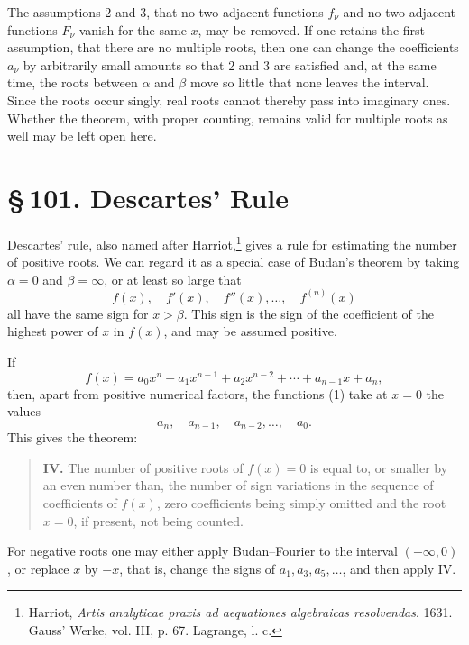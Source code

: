 \documentclass[11pt]{article}
\providecommand{\sect}[2]{\section*{\S\,#1. #2}}
\begin{document}
The assumptions 2 and 3, that no two adjacent functions $f_\nu$ and no two adjacent functions $F_\nu$ vanish for the same $x$, may be removed. If one retains the first assumption, that there are no multiple roots, then one can change the coefficients $a_\nu$ by arbitrarily small amounts so that 2 and 3 are satisfied and, at the same time, the roots between $\alpha$ and $\beta$ move so little that none leaves the interval. Since the roots occur singly, real roots cannot thereby pass into imaginary ones. Whether the theorem, with proper counting, remains valid for multiple roots as well may be left open here.

\sect{101}{Descartes' Rule}

Descartes' rule, also named after Harriot,\footnote{Harriot, \emph{Artis analyticae praxis ad aequationes algebraicas resolvendas}. 1631. Gauss' Werke, vol. III, p. 67. Lagrange, l. c.} gives a rule for estimating the number of positive roots. We can regard it as a special case of Budan's theorem by taking $\alpha=0$ and $\beta=\infty$, or at least so large that
\begin{equation}
        f(x),\quad f'(x),\quad f''(x),\ldots,\quad f^{(n)}(x)
\tag{1}
\end{equation}
all have the same sign for $x>\beta$. This sign is the sign of the coefficient of the highest power of $x$ in $f(x)$, and may be assumed positive.

If
\[
        f(x)=a_0x^n+a_1x^{n-1}+a_2x^{n-2}+\cdots+a_{n-1}x+a_n,
\]
then, apart from positive numerical factors, the functions (1) take at $x=0$ the values
\begin{equation}
        a_n,\quad a_{n-1},\quad a_{n-2},\ldots,\quad a_0.
\tag{2}
\end{equation}
This gives the theorem:

\begin{quote}
\textbf{IV.} The number of positive roots of $f(x)=0$ is equal to, or smaller by an even number than, the number of sign variations in the sequence of coefficients of $f(x)$, zero coefficients being simply omitted and the root $x=0$, if present, not being counted.
\end{quote}

For negative roots one may either apply Budan--Fourier to the interval $(-\infty,0)$, or replace $x$ by $-x$, that is, change the signs of $a_1,a_3,a_5,\ldots$, and then apply IV.
\end{document}
